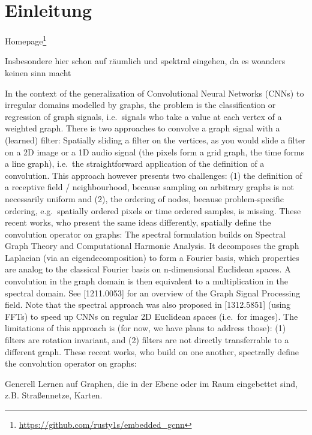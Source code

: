 \chapter{Einleitung}
\label{einleitung}

Homepage\footnote{\url{https://github.com/rusty1s/embedded\_gcnn}}

Insbesondere hier schon auf räumlich und spektral eingehen, da es woanders keinen sinn macht

In the context of the generalization of Convolutional Neural Networks (CNNs) to irregular domains modelled by graphs, the problem is the classification or regression of graph signals, i.e.\ signals who take a value at each vertex of a weighted graph. There is two approaches to convolve a graph signal with a (learned) filter:
Spatially sliding a filter on the vertices, as you would slide a filter on a 2D image or a 1D audio signal (the pixels form a grid graph, the time forms a line graph), i.e.\ the straightforward application of the definition of a convolution. This approach however presents two challenges: (1) the definition of a receptive field / neighbourhood, because sampling on arbitrary graphs is not necessarily uniform and (2), the ordering of nodes, because problem-specific ordering, e.g.\ spatially ordered pixels or time ordered samples, is missing. These recent works, who present the same ideas differently, spatially define the convolution operator on graphs:
The spectral formulation builds on Spectral Graph Theory and Computational Harmonic Analysis. It decomposes the graph Laplacian (via an eigendecomposition) to form a Fourier basis, which properties are analog to the classical Fourier basis on n-dimensional Euclidean spaces. A convolution in the graph domain is then equivalent to a multiplication in the spectral domain. See [1211.0053] for an overview of the Graph Signal Processing field. Note that the spectral approach was also proposed in [1312.5851] (using FFTs) to speed up CNNs on regular 2D Euclidean spaces (i.e.\ for images). The limitations of this approach is (for now, we have plans to address those): (1) filters are rotation invariant, and (2) filters are not directly transferrable to a different graph. These recent works, who build on one another, spectrally define the convolution operator on graphs:

Generell Lernen auf Graphen, die in der Ebene oder im Raum eingebettet sind, z.B. Straßennetze, Karten.



